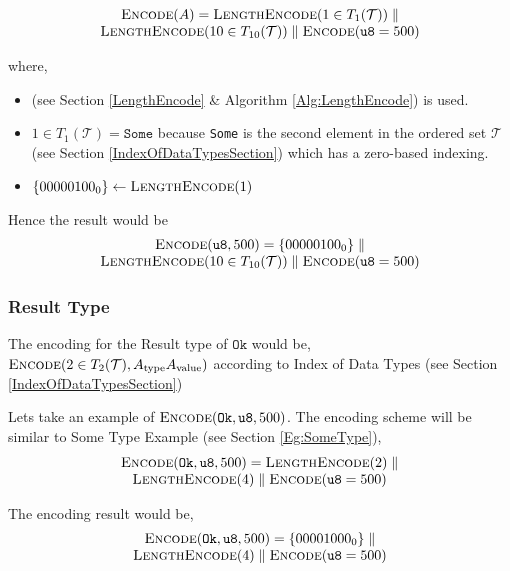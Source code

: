 \documentclass[../alan-handbook.tex]{subfiles}
\begin{document}
$$
\begin{matrix}
    \Call{Encode}{A}=\Call{LengthEncode}{1 \in T_1(\mathcal{T})} \parallel \\
    \Call{LengthEncode}{10 \in T_{10}(\mathcal{T})} \parallel \Call{Encode}{\texttt{u8}=500}
\end{matrix}
$$

where, 
\begin{itemize}
    \item {} (see Section \ref{LengthEncode} \& Algorithm \ref{Alg:LengthEncode}) is used.
    \item $1 \in T_1(\mathcal{T})=\texttt{Some}$ because \texttt{Some} is the second element in the ordered set $\mathcal{T}$ (see Section \ref{IndexOfDataTypesSection}) which has a zero-based indexing.
    \item $\{00000100_0\} \gets \Call{LengthEncode}{1}$
\end{itemize}

Hence the result would be
$$
\begin{matrix}
    \Call{Encode}{\texttt{u8}, 500} = \{00000100_0\} \parallel \\
    \Call{LengthEncode}{10 \in T_{10}(\mathcal{T})} \parallel \Call{Encode}{\texttt{u8}=500}
\end{matrix}
$$

\subsubsection{Result Type} \label{Eg:ResultType}

The encoding for the Result type of $\texttt{Ok}$ would be, $\Call{Encode}{2 \in T_2(\mathcal{T}), A_{\text{type}}  A_{\text{value}}}$ according to Index of Data Types (see Section \ref{IndexOfDataTypesSection})

Lets take an example of $\Call{Encode}{\texttt{Ok},\texttt{u8}, 500}$. The encoding scheme will be similar to Some Type Example (see Section \ref{Eg:SomeType}),
$$
\begin{matrix}
    \Call{Encode}{\texttt{Ok},\texttt{u8}, 500} = \Call{LengthEncode}{2} \parallel \\ 
    \Call{LengthEncode}{4} \parallel \Call{Encode}{\texttt{u8}=500}
\end{matrix}
$$

The encoding result would be,
$$
\begin{matrix}
    \Call{Encode}{\texttt{Ok},\texttt{u8}, 500} = \{00001000_0\} \parallel \\ 
    \Call{LengthEncode}{4} \parallel \Call{Encode}{\texttt{u8}=500}
\end{matrix}    
$$
\end{document}
